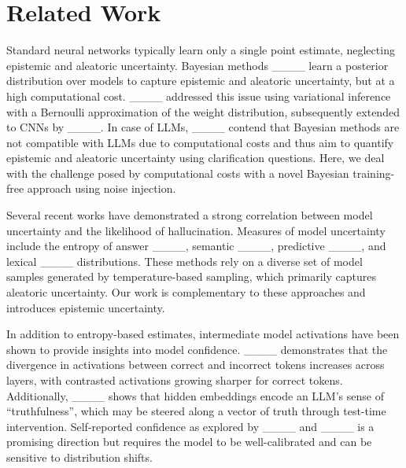 \section{Related Work}
 Standard neural networks typically learn only a single point estimate, neglecting epistemic and aleatoric uncertainty. Bayesian methods ____ learn a posterior distribution over models to capture epistemic and aleatoric uncertainty, but at a high computational cost. ____ addressed this issue using variational inference with a Bernoulli approximation of the weight distribution, subsequently extended to CNNs by ____. In case of LLMs, ____ contend that Bayesian methods are not compatible with LLMs due to computational costs and thus aim to quantify epistemic and aleatoric uncertainty using clarification questions. Here, we deal with the challenge posed by computational costs with a novel Bayesian training-free approach using noise injection.


Several recent works have demonstrated a strong correlation between model uncertainty and the likelihood of hallucination. Measures of model uncertainty include  the entropy of answer ____, semantic ____, predictive ____, and lexical ____ distributions. These methods rely on a diverse set of model samples generated by temperature-based sampling, which primarily captures aleatoric uncertainty. Our work is complementary to these approaches and introduces epistemic uncertainty.

In addition to entropy-based estimates, intermediate model activations have been shown to provide insights into model confidence. ____ demonstrates that the divergence in activations between correct and incorrect tokens increases across layers, with contrasted activations growing sharper for correct tokens. 
Additionally, ____ shows that hidden embeddings encode an LLM's sense of ``truthfulness'', which may be steered along a vector of truth through test-time intervention. 
Self-reported confidence as explored by ____ and ____ is a promising direction but requires the model to be well-calibrated and can be sensitive to distribution shifts. %